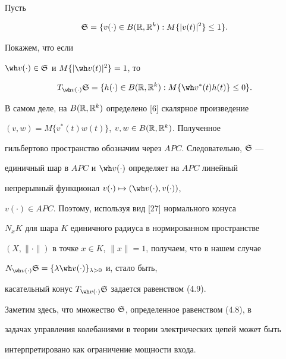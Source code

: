 \begin{exams}


Пусть


\begin{equation}


\gS=\{v(\cdot)\in B(\R,\R^{k}): M\{|v(t)|^{2}\}\le1\}.


\end{equation}


Покажем, что если


$\wh v(\cdot)\in\gS$ и $M\{|\wh v(t)|^{2}\}=1$, то


\begin{equation}


T_{\wh v(\cdot)}\gS=\{h(\cdot)\in B(\R,\R^{k}):


M\{\wh v^{*}(t)h(t)\}\le0\}.


\end{equation}


В самом деле, на $B(\Bbb R,\Bbb R^{k})$ определено [6] скалярное произведение


$(v,w)= M\{v^{*}(t)w(t)\}$, $v,w\in B(\Bbb R,\Bbb R^{k})$. Полученное


гильбертово пространство обозначим через $APC$. Следовательно, $\frak S$ ---


единичный шар в $APC$ и $\wh v(\cdot)$ определяет на $APC$ линейный


непрерывный функционал $v(\cdot)\mapsto (\wh v(\cdot), v(\cdot))$,


$v(\cdot)\in APC$. Поэтому, используя вид [27] нормального конуса


$N_{x}K$ для шара $K$ единичного радиуса в нормированном пространстве


$(X,\|\cdot\|)$ в точке $x\in K$, $\|x\|=1$, получаем, что в нашем случае


$N_{\wh v(\cdot)}\gS=\{\lambda\wh v(\cdot)\}_{\lambda>0}$ и, стало быть,


касательный конус $T_{\wh v(\cdot)}\gS$ задается равенством (4.9).


\end{exams}





Заметим здесь, что множество $\frak S$, определенное равенством (4.8), в


задачах управления колебаниями в теории электрических цепей может быть


интерпретировано как ограничение мощности входа.





